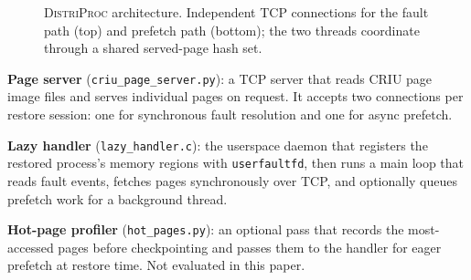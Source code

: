 \documentclass[journal]{IEEEtran}
\newcommand{\distriproc}{\textsc{DistriProc}\xspace}
\newcommand{\uffd}{\texttt{userfaultfd}\xspace}
\begin{document}
\begin{figure}[t]
\centering
{}
\caption{\distriproc architecture. Independent TCP connections for the
fault path (top) and prefetch path (bottom); the two threads coordinate
through a shared served-page hash set.}
\label{fig:arch}
\end{figure}

\textbf{Page server} (\texttt{criu\_page\_server.py}): a TCP server that
reads CRIU page image files and serves individual pages on request. It
accepts two connections per restore session: one for synchronous fault
resolution and one for async prefetch.

\textbf{Lazy handler} (\texttt{lazy\_handler.c}): the userspace daemon
that registers the restored process's memory regions with \uffd, then runs
a main loop that reads fault events, fetches pages synchronously over TCP,
and optionally queues prefetch work for a background thread.

\textbf{Hot-page profiler} (\texttt{hot\_pages.py}): an optional pass that
records the most-accessed pages before checkpointing and passes them to the
handler for eager prefetch at restore time. Not evaluated in this paper.
\end{document}
